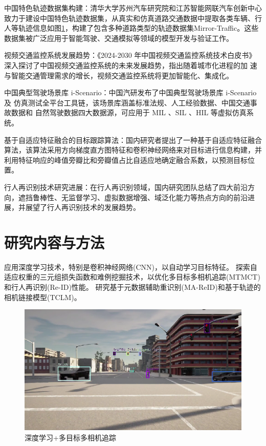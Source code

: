 中国特色轨迹数据集构建：清华大学苏州汽车研究院和江苏智能网联汽车创新中心致力于建设中国特色轨迹数据集，从真实和仿真道路交通数据中提取各类车辆、行人等轨迹信息如图\ref{fig:p26}，构建了包含多种道路类型的轨迹数据集Mirror-Traffic\cite{tsinghua2021mirrortraffic}。这些数据集被广泛应用于智能驾驶、交通模拟等领域的模型开发与验证工作。

视频交通监控系统发展趋势：《2024-2030 年中国视频交通监控系统技术白皮书》\cite{cetc2024whitepaper}深入探讨了中国视频交通监控系统的未来发展趋势，指出随着城市化进程的加 速与智能交通管理需求的增长，视频交通监控系统将更加智能化、集成化。

中国典型驾驶场景库 i-Scenario：中国汽研发布了中国典型驾驶场景库 i-Scenario 及 仿真测试全平台工具链，该场景库涵盖标准法规、人工经验数据、中国交通事故数据和 自然驾驶数据四大数据源，可应用于 MIL 、SIL 、HIL 等虚拟仿真系统。

基于自适应特征融合的目标跟踪算法：国内研究者提出了一种基于自适应特征融合算法\cite{chen2023adaptive}，该算法采用方向梯度直方图特征和卷积神经网络来对目标进行信息构建，并利用特征响应的峰值旁瓣比和旁瓣值占比自适应地确定融合系数，以预测目标位置。

行人再识别技术研究进展：在行人再识别领域，国内研究团队总结了四大前沿方向\cite{li2023progress}，遮挡鲁棒性、无监督学习、虚拟数据增强、域泛化能力等热点方向的前沿进展，并展望了行人再识别技术的发展趋势。

\section{研究内容与方法}

应用深度学习技术，特别是卷积神经网络(CNN)，以自动学习目标特征。
探索自适应权重的三元组损失函数和难例挖掘技术，以优化多目标多相机追踪(MTMCT)和行人再识别(Re-ID)性能。
研究基于元数据辅助重识别(MA-ReID)和基于轨迹的相机链接模型(TCLM)。

\begin{figure}[htbp] %
	\centering
	\includegraphics[width=1.0\textwidth]{p26} %
	\caption{深度学习+多目标多相机追踪} %
	\label{fig:p26} %
\end{figure}

